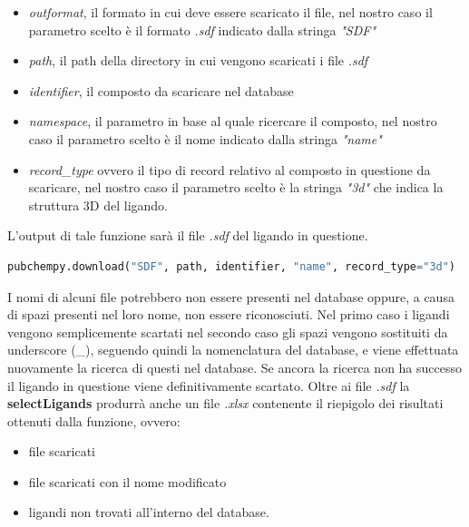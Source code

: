 \begin{itemize}
    \item \textit{outformat}, il formato in cui deve essere scaricato il file,  nel nostro caso il parametro scelto è il formato \textit{.sdf} indicato dalla stringa \textit{"SDF"}
    \item \textit{path}, il path della directory in cui vengono scaricati i file \textit{.sdf}
    \item \textit{identifier}, il composto da scaricare nel database
    \item \textit{namespace}, il parametro in base al quale ricercare il composto, nel nostro caso il parametro scelto è il nome indicato dalla stringa \textit{"name"}
    \item \textit{record\_type} ovvero il tipo di record relativo al composto in questione da scaricare, 
    nel nostro caso il parametro scelto è la stringa \textit{"3d"} che indica la struttura 3D del ligando.
\end{itemize}

L'output di tale funzione sarà il file \textit{.sdf} del ligando in questione.

\begin{lstlisting}[language=Python,  label=lst:code6, caption={pubchempy.download}]
pubchempy.download("SDF", path, identifier, "name", record_type="3d")
\end{lstlisting}

I nomi di alcuni file potrebbero non essere presenti nel database oppure, a causa di spazi presenti nel loro nome, non essere riconosciuti. Nel primo caso i ligandi vengono semplicemente scartati nel secondo caso gli spazi vengono sostituiti da underscore (\_), seguendo quindi la nomenclatura del database, e viene effettuata nuovamente la ricerca di questi nel database. Se ancora la ricerca non ha successo il ligando in questione viene definitivamente scartato.\newline
Oltre ai file \textit{.sdf} la \textbf{selectLigands} produrrà anche un file \textit{.xlsx} contenente il riepigolo dei risultati ottenuti dalla funzione, ovvero:

\begin{itemize}
    \item file scaricati
    \item file scaricati con il nome modificato 
    \item ligandi non trovati all'interno del database.
\end{itemize}

